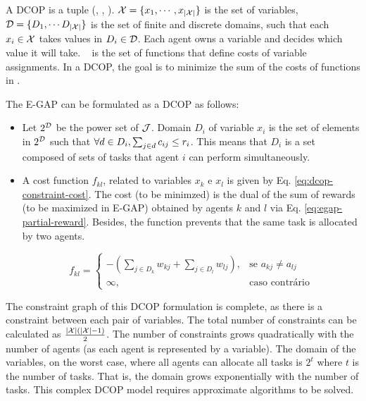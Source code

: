 A DCOP is a tuple (\variables, \domains, \functions). $\mathcal{X} = \{x_1,\cdots,x_{|\mathcal{X}|}\}$ is the set of variables, $\mathcal{D} = \{D_1,\cdots D_{|\mathcal{X}|}\}$ is the set of finite and discrete domains, such that each $x_i \in \mathcal{X}$ takes values in $D_i \in \mathcal{D}$. Each agent owns a variable and decides which value it will take. \functions~ is the set of functions that define costs of variable assignments. In a DCOP, the goal is to minimize the sum of the costs of functions in \functions. 

The E-GAP can be formulated as a DCOP as follows:

\begin{itemize}
  \item Let $2^{\mathcal{D}}$ be the power set of $\mathcal{J}$. Domain $D_i$ of variable $x_i$ is the set of elements in $2^{\mathcal{D}}$ such that $\forall d \in D_i, \sum_{j \in d} c_{ij} \leq r_{i}$. This means that $D_i$ is a set composed of sets of tasks that agent $i$ can perform simultaneously.
  \item A cost function $f_{kl}$, related to variables $x_k$ e $x_l$ is given by Eq. \ref{eq:dcop-constraint-cost}. The cost (to be minimzed) is the dual of the sum of rewards (to be maximized in E-GAP) obtained by agents $k$ and $l$ via Eq. \ref{eq:egap-partial-reward}. Besides, the function prevents that the same task is allocated by two agents.

\begin{equation}
\label{eq:dcop-constraint-cost}
f_{kl} = 
\begin{cases}
  - \left(\sum_{j \in D_k} w_{kj} + \sum_{j \in D_l} w_{lj}\right) ,& \text{se } a_{kj} \neq a_{lj}\\
  \infty,& \text{caso contrário}
\end{cases}
\end{equation}

\end{itemize}
The constraint graph of this DCOP formulation is complete, as there is a constraint between each pair of variables. The total number of constraints can be calculated as $\frac{|\mathcal{X}|(|\mathcal{X}|-1)}{2}$. The number of constraints grows quadratically with the number of agents (as each agent is represented by a variable). The domain of the variables, on the worst case, where all agents can allocate all tasks is $2^{t}$ where $t$ is the number of tasks. That is, the domain grows exponentially with the number of tasks. This complex DCOP model requires approximate algorithms to be solved.


